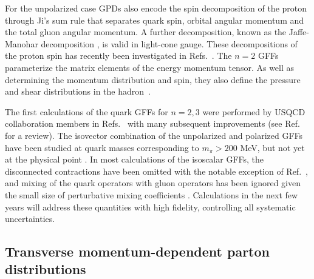 For the unpolarized case
GPDs also encode the spin decomposition of the proton through Ji's sum rule \cite{Ji:1996ek} that separates quark spin, orbital angular momentum and the total gluon angular momentum. 
A further decomposition, known as the Jaffe-Manohar decomposition \cite{Jaffe:1989jz}, is valid in light-cone gauge. These decompositions of the proton spin has recently been investigated in Refs.~\cite{Yang:2016plb,Alexandrou:2017oeh}.
The $n=2$ GFFs  parameterize the matrix elements of the energy momentum tensor. As well as determining the momentum distribution and spin, they 
also define the pressure and shear distributions in the hadron~\cite{Polyakov:2018zvc}.

The first calculations of the quark GFFs for $n=2,3$ were performed by USQCD collaboration members in Refs.~\cite{Hagler:2003jd} with many subsequent improvements (see Ref.~\cite{Hagler:2009mb} for a review). The isovector combination of the unpolarized and polarized GFFs have been studied at quark masses corresponding to $m_\pi>200$ MeV, but not yet at the physical point \cite{Syritsyn:2011vk,Bali:2013dpa,Hagler:2007xi,Bratt:2010jn,Sternbeck:2012rw,Brommel:2007sb,Gockeler:2003jfa,Alexandrou:2011nr}. In most calculations of the isoscalar GFFs, the disconnected contractions have been omitted with the notable exception of Ref.~\cite{Deka:2013zha}, and mixing of the quark operators with gluon operators has been ignored given the small size of perturbative mixing coefficients \cite{Alexandrou:2016ekb}.  Calculations in the next few years will address these quantities with high fidelity, controlling all systematic uncertainties.



\subsection{Transverse momentum-dependent parton distributions}
\label{TMDs}



